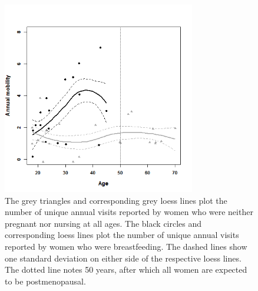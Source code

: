 \begin{figure}[!htb]
  \includegraphics[width=0.75\textwidth]{lactmob}
\caption{The grey triangles and corresponding grey loess lines plot the number of unique annual visits reported by women who were neither pregnant nor nursing at all ages.  The black circles and corresponding loess lines plot the number of unique annual visits reported by women who were breastfeeding.  The dashed lines show one standard deviation on either side of the respective loess lines.  The dotted line notes 50 years, after which all women are expected to be postmenopausal.}
\label{fig:lactmob}       %
\end{figure}


